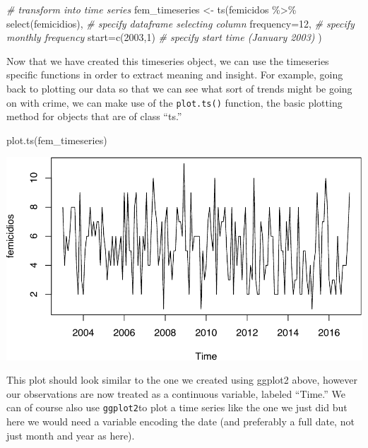 \documentclass[
  krantz2]{krantz}
\makeatletter
\newenvironment{Shaded}{\begin{snugshade}}{\end{snugshade}}
\newcommand{\AttributeTok}[1]{\textcolor[rgb]{0.61,0.61,0.61}{#1}}
\newcommand{\CommentTok}[1]{\textcolor[rgb]{0.37,0.37,0.37}{\textit{#1}}}
\newcommand{\DecValTok}[1]{\textcolor[rgb]{0.06,0.06,0.06}{#1}}
\newcommand{\FunctionTok}[1]{\textcolor[rgb]{0,0,0}{#1}}
\newcommand{\NormalTok}[1]{#1}
\newcommand{\OtherTok}[1]{\textcolor[rgb]{0.37,0.37,0.37}{#1}}
\newcommand{\SpecialCharTok}[1]{\textcolor[rgb]{0,0,0}{#1}}
\newenvironment{kframe}{%
\medskip{}
\setlength{\fboxsep}{.8em}
 \def\at@end@of@kframe{}%
 \ifinner\ifhmode%
  \def\at@end@of@kframe{\end{minipage}}%
  \begin{minipage}{\columnwidth}%
 \fi\fi%
 \def\FrameCommand##1{\hskip\@totalleftmargin \hskip-\fboxsep
 \colorbox{shadecolor}{##1}\hskip-\fboxsep
     \hskip-\linewidth \hskip-\@totalleftmargin \hskip\columnwidth}%
 \MakeFramed {\advance\hsize-\width
   \@totalleftmargin\z@ \linewidth\hsize
   \@setminipage}}%
 {\par\unskip\endMakeFramed%
 \at@end@of@kframe}
\renewenvironment{Shaded}{\begin{kframe}}{\end{kframe}}
\makeatother
\begin{document}
\begin{Shaded}
\begin{Highlighting}[]
\CommentTok{\# transform into time series}
\NormalTok{fem\_timeseries }\OtherTok{\textless{}{-}} \FunctionTok{ts}\NormalTok{(femicidos }\SpecialCharTok{\%\textgreater{}\%} 
                       \FunctionTok{select}\NormalTok{(femicidios), }\CommentTok{\# specify dataframe selecting column}
                     \AttributeTok{frequency=}\DecValTok{12}\NormalTok{,  }\CommentTok{\# specify monthly frequency}
                     \AttributeTok{start=}\FunctionTok{c}\NormalTok{(}\DecValTok{2003}\NormalTok{,}\DecValTok{1}\NormalTok{) }\CommentTok{\# specify start time (January 2003)}
\NormalTok{                     )}
\end{Highlighting}
\end{Shaded}

Now that we have created this timeseries object, we can use the timeseries specific functions in order to extract meaning and insight. For example, going back to plotting our data so that we can see what sort of trends might be going on with crime, we can make use of the \texttt{plot.ts()} function, the basic plotting method for objects that are of class ``ts.''

\begin{Shaded}
\begin{Highlighting}[]
\FunctionTok{plot.ts}\NormalTok{(fem\_timeseries)}
\end{Highlighting}
\end{Shaded}

\includegraphics{crime_mapping_files/figure-latex/plot.ts_8a-1.pdf}

This plot should look similar to the one we created using ggplot2 above, however our observations are now treated as a continuous variable, labeled ``Time.'' We can of course also use \texttt{ggplot2}to plot a time series like the one we just did but here we would need a variable encoding the date (and preferably a full date, not just month and year as here).
\end{document}
